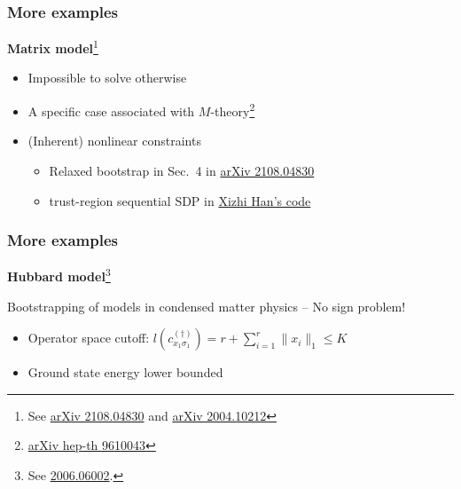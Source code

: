 \documentclass{beamer}
\begin{document}
\begin{frame}
\frametitle{More examples}

\textbf{Matrix model}\footnote{See \href{https://arxiv.org/pdf/2108.04830.pdf}{arXiv 2108.04830} and \href{https://arxiv.org/abs/2004.10212}{arXiv 2004.10212}}

\begin{itemize}
    \item Impossible to solve otherwise
    \item A specific case associated with $M$-theory\footnote{\href{https://arxiv.org/abs/hep-th/9610043}{arXiv hep-th 9610043}}
    \item (Inherent) nonlinear constraints
    \begin{itemize}
        \item Relaxed bootstrap in Sec.~4 in \href{https://arxiv.org/pdf/2108.04830.pdf}{arXiv 2108.04830}
        \item trust-region sequential SDP in \href{https://github.com/hanxzh94/matrix-bootstrap}{Xizhi Han's code}
    \end{itemize}
\end{itemize}

\end{frame}

\begin{frame}
\frametitle{More examples}

\textbf{Hubbard model}\footnote{See \href{https://arxiv.org/abs/2006.06002}{2006.06002}.}

Bootstrapping of models in condensed matter physics -- No sign problem!



\begin{itemize}
    \item Operator space cutoff: $l(c_{x_1 \sigma_1}^{(\dagger)}) = r + \sum_{i=1}^r \|x_i \|_1 \leq K$ 
    \item Ground state energy lower bounded
\end{itemize}

\end{frame}
\end{document}
